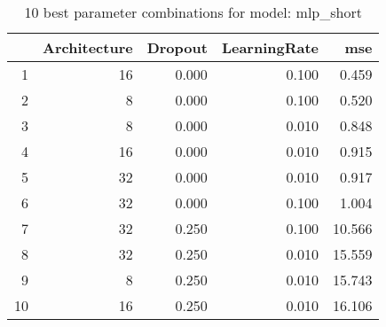 \begin{table}[ht]
\centering
\begin{tabular}{rrrrr}
  \hline
 & Architecture & Dropout & LearningRate & mse \\ 
  \hline
1 &   16 & 0.000 & 0.100 & 0.459 \\ 
  2 &    8 & 0.000 & 0.100 & 0.520 \\ 
  3 &    8 & 0.000 & 0.010 & 0.848 \\ 
  4 &   16 & 0.000 & 0.010 & 0.915 \\ 
  5 &   32 & 0.000 & 0.010 & 0.917 \\ 
  6 &   32 & 0.000 & 0.100 & 1.004 \\ 
  7 &   32 & 0.250 & 0.100 & 10.566 \\ 
  8 &   32 & 0.250 & 0.010 & 15.559 \\ 
  9 &    8 & 0.250 & 0.010 & 15.743 \\ 
  10 &   16 & 0.250 & 0.010 & 16.106 \\ 
   \hline
\end{tabular}
\caption{10 best parameter combinations for model: mlp_short} 
\label{tab:mlp_short_top_10}
\end{table}
